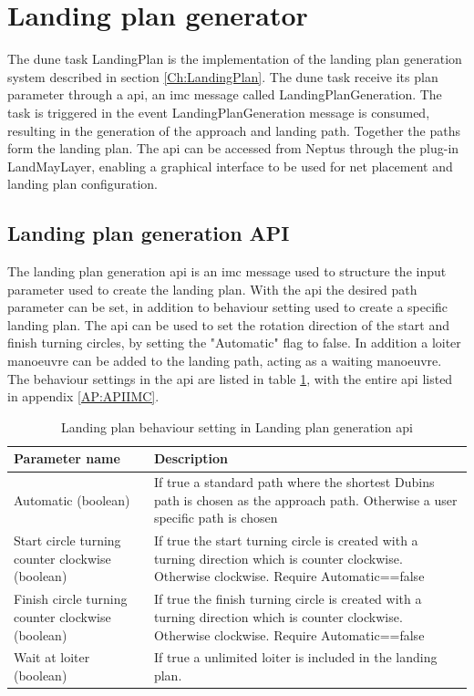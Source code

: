 \section{Landing plan generator}
The \gls{dune} task LandingPlan is the implementation of the landing plan generation system described in section \ref{Ch:LandingPlan}. The \gls{dune} task receive its plan parameter through a \acrfull{api}, an \gls{imc} message called LandingPlanGeneration. The task is triggered in the event LandingPlanGeneration message is consumed, resulting in the generation of the approach and landing path. Together the paths form the landing plan. The \gls{api} can be accessed from Neptus through the plug-in LandMayLayer, enabling a graphical interface to be used for net placement and landing plan configuration.
\subsection{Landing plan generation API}
The landing plan generation \acrfull{api} is an \gls{imc} message used to structure the input parameter used to create the landing plan. With the \gls{api} the desired path parameter can be set, in addition to behaviour setting used to create a specific landing plan. The \gls{api} can be used to set the rotation direction of the start and finish turning circles, by setting the "Automatic" flag to false. In addition a loiter manoeuvre can be added to the landing path, acting as a waiting manoeuvre. The behaviour settings in the \gls{api} are listed in table \ref{Tb:DubinConfig}, with the entire \gls{api} listed in appendix \ref{AP:APIIMC}.
\newpage
\begin{table}[H]
\centering
\begin{tabular}{| p{2.7cm} | p{6cm} |}
\hline
\textbf{Parameter name} 							& \textbf{Description} \\ \hline
 Automatic (boolean)								& If true a standard path where the shortest Dubins path is chosen as the approach path. Otherwise a user specific path is chosen \\ \hline
Start circle turning counter clockwise (boolean)	& If true the start turning circle is created with a turning direction which is counter clockwise. Otherwise clockwise. Require Automatic==false \\ \hline
Finish circle turning counter clockwise (boolean)	& If true the finish turning circle is created with a turning direction which is counter clockwise. Otherwise clockwise. Require Automatic==false \\ \hline
Wait at loiter (boolean)							& If true a unlimited loiter is included in the landing plan. \\ \hline

\end{tabular}
\caption{Landing plan behaviour setting in Landing plan generation \gls{api}}
\label{Tb:DubinConfig}
\end{table}
